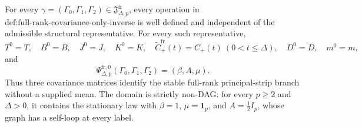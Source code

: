 For every \(\gamma=(\Gamma_0,\Gamma_1,\Gamma_2)\in\mathfrak J_{\Delta,p}^{\mathrm{fr}}\), every operation in \(\text{def:full-rank-covariance-only-inverse}\) is well defined and independent of the admissible structural representative.  For every such representative,
\[
 T^0=T,\quad B^0=B,\quad J^0=J,\quad K^0=K,
 \quad \widetilde C_{+}^{\mathrm{fr}}(t)=C_{+}(t)\ (0<t\leq\Delta),
 \quad D^0=D,\quad m^0=m,
\]
and
\[
 \Psi_{\Delta,p}^{\mathrm{fr},0}(\Gamma_0,\Gamma_1,\Gamma_2)
 = (\beta,A,\mu).
\]
Thus three covariance matrices identify the stable full-rank principal-strip branch without a supplied mean.  The domain is strictly non-DAG: for every \(p\geq2\) and \(\Delta>0\), it contains the stationary law with \(\beta=1\), \(\mu=\mathbf 1_p\), and \(A=\tfrac12 I_p\), whose graph has a self-loop at every label.